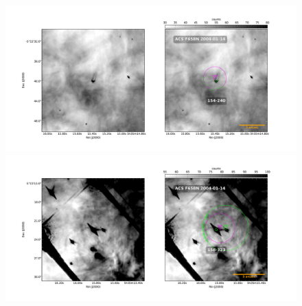 \documentclass{article}
\begin{document}
\begin{figure}
   \includegraphics[width=0.5\linewidth]{j8oc01010_wcs/154-240-Bally_01-images.pdf}
   \includegraphics[width=0.5\linewidth]{j8oc01010_wcs/158-323-Bally_01-images.pdf}
  \label{fig:images}
\end{figure}
\end{document}
